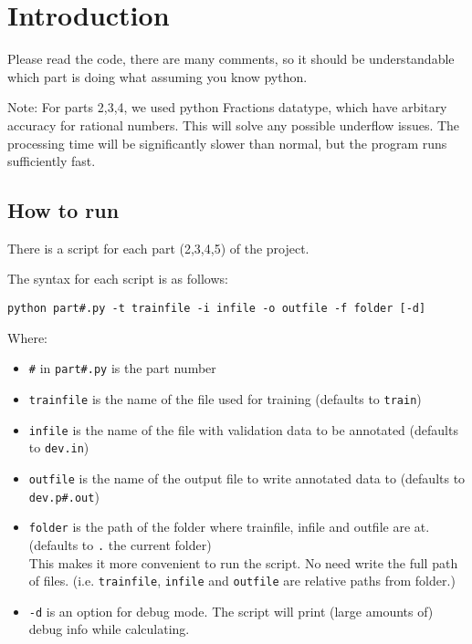 \documentclass[12pt]{article}
\begin{document}
\maketitle

\section{Introduction}

Please read the code, there are many comments, so it should be understandable which part is doing what assuming you know python.

\bigskip

Note: For parts 2,3,4, we used python Fractions datatype, which have arbitary accuracy for rational numbers. This will solve any possible underflow issues. The processing time will be significantly slower than normal, but the program runs sufficiently fast.

\subsection{How to run}
There is a script for each part (2,3,4,5) of the project.

The syntax for each script is as follows:

\begin{verbatim}
python part#.py -t trainfile -i infile -o outfile -f folder [-d]
\end{verbatim}
Where:
\begin{itemize}
\item \texttt{\#} in \texttt{part\#.py} is the part number
\item \texttt{trainfile} is the name of the file used for training (defaults to \texttt{train})
\item \texttt{infile} is the name of the file with validation data to be annotated (defaults to \texttt{dev.in})
\item \texttt{outfile} is the name of the output file to write annotated data to (defaults to \texttt{dev.p\#.out})
\item \texttt{folder} is the path of the folder where trainfile, infile and outfile are at. (defaults to \texttt{.} the current folder) \\
This makes it more convenient to run the script. No need write the full path of files. (i.e. \texttt{trainfile}, \texttt{infile} and \texttt{outfile} are relative paths from folder.)
\item \texttt{-d} is an option for debug mode. The script will print (large amounts of) debug info while calculating.
\end{itemize}
\end{document}
